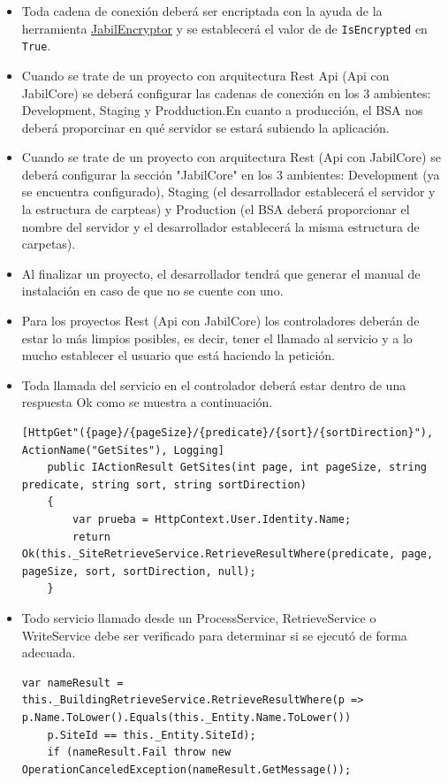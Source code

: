 \documentclass[a4paper, 10pt]{article}
\begin{document}
\newpage
\begin{itemize}
	\item Toda cadena de conexión deberá ser encriptada con la ayuda de la herramienta \href{}{JabilEncryptor} y se establecerá el valor de de \texttt{IsEncrypted} en \texttt{True}.
	
	\item Cuando se trate de un proyecto con arquitectura \sffamily Rest Api \normalfont (Api con JabilCore) se deberá configurar las cadenas de conexión en los 3 ambientes: \sffamily Development, Staging y Prodduction.\normalfont En cuanto a producción, el BSA nos deberá proporcinar en qué servidor se estará subiendo la aplicación.
	
	\item Cuando se trate de un proyecto con arquitectura \sffamily Rest \normalfont (Api con JabilCore) se deberá configurar la sección "JabilCore" en los 3 ambientes: Development (ya se encuentra configurado), Staging (el desarrollador establecerá el servidor y la estructura de carpteas) y Production (el BSA deberá proporcionar el nombre del servidor y el desarrollador establecerá la misma estructura de carpetas).
	
	\item Al finalizar un proyecto, el desarrollador tendrá que generar el manual de instalación en caso de que no se cuente con uno.
	
	\item Para los proyectos \sffamily Rest \normalfont (Api con JabilCore) los controladores deberán de estar lo más limpios posibles, es decir, tener el llamado al servicio y a lo mucho establecer el usuario que está haciendo la petición.
	
	\item Toda llamada del servicio en el controlador deberá estar dentro de una respuesta \sffamily Ok \normalfont como se muestra a continuación.
	\begin{lstlisting}[language={[Sharp]C}]
	[HttpGet"({page}/{pageSize}/{predicate}/{sort}/{sortDirection}"), ActionName("GetSites"), Logging]
	public IActionResult GetSites(int page, int pageSize, string predicate, string sort, string sortDirection)
	{
		var prueba = HttpContext.User.Identity.Name;
		return Ok(this._SiteRetrieveService.RetrieveResultWhere(predicate, page, pageSize, sort, sortDirection, null);
	}
	\end{lstlisting}

	\item Todo servicio llamado desde un \sffamily ProcessService, RetrieveService o WriteService \normalfont debe ser verificado para determinar si se ejecutó de forma adecuada.
	\begin{lstlisting}[language={[Sharp]C}]
	var nameResult = this._BuildingRetrieveService.RetrieveResultWhere(p => p.Name.ToLower().Equals(this._Entity.Name.ToLower())
	p.SiteId == this._Entity.SiteId);
	if (nameResult.Fail throw new OperationCanceledException(nameResult.GetMessage()); 
	\end{lstlisting}
	

\end{itemize}
\end{document}
